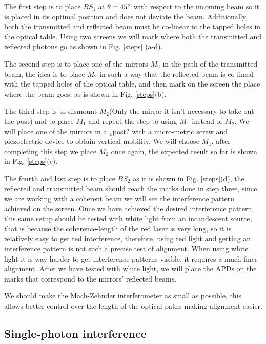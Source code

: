 \documentclass{book}
\begin{document}
The first step is to place $BS_{1}$ at $\theta=45\degree$ with respect to the incoming beam so it is placed in its optimal position and does not deviate the beam. Additionally, both the transmitted and reflected beam must be co-linear to the tapped holes in the optical table. Using two screens we will mark where both the transmitted and reflected photons go as shown in Fig. \ref{steps} (a-d).

The second step is to place one of the mirrors $M_{2}$ in the path of the transmitted beam, the idea is to place $M_{2}$ in such a way that the reflected beam is co-lineal with the tapped holes of the optical table, and then mark on the screen the place where the beam goes, as is shown in Fig. \ref{steps}(b).

The third step is to dismount $M_{2}$(Only the mirror it isn't necessary to take out the post) and to place $M_{1}$ and repeat the step to using $M_{1}$ instead of $M_{2}$. We will place one of the mirrors in a ¿post? with a micro-metric screw and piezoelectric device to obtain vertical mobility, We will choose $M_{1}$, after completing this step we place $M_{2}$ once again, the expected result so far is shown in Fig. \ref{steps}(c).

The fourth and last step is to place $BS_{2}$ as it is shown in Fig. \ref{steps}(d), the reflected and transmitted beam should reach the marks done in step three, since we are working with a coherent beam we will see the interference pattern achieved on the screen. Once we have achieved the desired interference pattern, this same setup should be tested with white light from an incandescent source, that is because the coherence-length of the red laser is very long, so it is relatively easy to get red interference, therefore, using red light and getting an interference pattern is not such a precise test of alignment. When using white light it is way harder to get interference patterns visible, it requires a much finer alignment. After we have tested with white light, we will place the APDs on the marks that correspond to the mirrors' reflected beams.


We should make the Mach-Zehnder interferometer as small as possible, this allows better control over the length of the optical paths making alignment easier.

\subsection{Single-photon interference}
\end{document}
